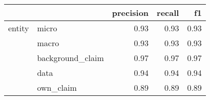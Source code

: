 \begin{tabular}{llrrr}
\toprule
       &           &  precision &  recall &   f1 \\
\midrule
entity & micro &       0.93 &    0.93 & 0.93 \\
       & macro &       0.93 &    0.93 & 0.93 \\
       & background\_claim &       0.97 &    0.97 & 0.97 \\
       & data &       0.94 &    0.94 & 0.94 \\
       & own\_claim &       0.89 &    0.89 & 0.89 \\
\bottomrule
\end{tabular}
